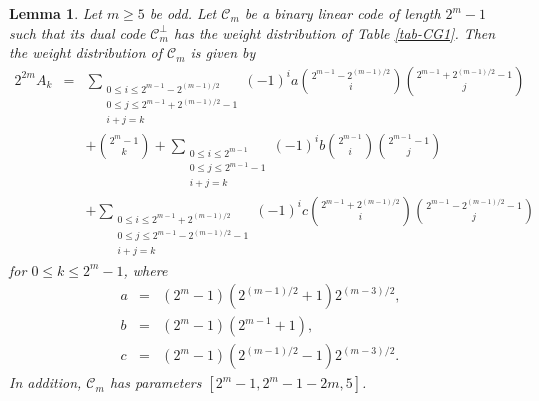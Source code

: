 \documentclass[1p,final]{elsarticle}
\newtheorem{lemma}[theorem]{Lemma}
\newcommand{\C}{{\mathcal{C}}}
\begin{document}
\begin{lemma}\label{lem-TZwt}
Let $m \geq 5$ be odd. 
Let $\C_m$ be a binary linear code of length $2^m-1$ such that its dual code
$\C_m^\perp$ has the weight distribution of Table \ref{tab-CG1}. Then the weight distribution
of $\C_m$ is given by
\begin{eqnarray*}
2^{2m}A_k&=& \sum_{\substack{0 \le i \le 2^{m-1}-2^{(m-1)/2} \\
0\le j \le 2^{m-1}+2^{(m-1)/2}-1 \\i+j=k}}(-1)^ia\binom{2^{m-1}-2^{(m-1)/2}} {i} \binom{2^{m-1}+2^{(m-1)/2}-1}{j}\\
& & + \binom {2^m-1}{k}+\sum_{\substack{0 \le i \le 2^{m-1} \\
0\le j \le 2^{m-1}-1 \\i+j=k}}(-1)^ib\binom{2^{m-1}} {i}\binom{2^{m-1}-1} {j} \\
& & + \sum_{\substack{0 \le i \le 2^{m-1}+2^{(m-1)/2} \\
0\le j \le 2^{m-1}-2^{(m-1)/2}-1 \\i+j=k}}(-1)^ic\binom{2^{m-1}+2^{(m-1)/2}}{i}\binom{2^{m-1}-2^{(m-1)/2}-1}{j} 
\end{eqnarray*}
for $0 \le k \le 2^m-1$, where 
\begin{eqnarray*}
a &=& (2^m-1)(2^{(m-1)/2}+1)2^{(m-3)/2}, \\   
b &=& (2^m-1)(2^{m-1}+1), \\  
c &=& (2^m-1)(2^{(m-1)/2}-1)2^{(m-3)/2}.
\end{eqnarray*} 
In addition, $\C_m$ has parameters $[2^m-1, 2^m-1-2m, 5]$. 
\end{lemma}
\end{document}
